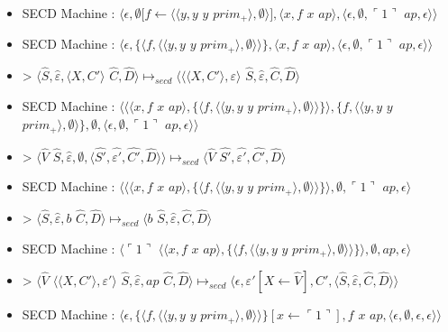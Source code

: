 \documentclass[10pt,a4paper]{article}
\begin{document}
\begin{itemize}
					\item[] SECD Machine : $\langle\epsilon,\emptyset[f \leftarrow \langle\langle y,y$ $y$ $prim_{+}\rangle,\emptyset\rangle],\langle x,f$ $x$ $ap\rangle,\langle\epsilon,\emptyset,\ulcorner 1\urcorner$ $ap,\epsilon\rangle\rangle$
					\item[] SECD Machine : $\langle\epsilon,\{\langle f,\langle\langle y,y$ $y$ $prim_{+}\rangle,\emptyset\rangle\rangle\},\langle x,f$ $x$ $ap\rangle,\langle\epsilon,\emptyset,\ulcorner 1\urcorner$ $ap,\epsilon\rangle\rangle$
					\item[] >  $\langle\widehat{S},\widehat{\varepsilon},\langle X,C'\rangle$ $\widehat{C},\widehat{D}\rangle \longmapsto_{secd} \langle\langle\langle X,C'\rangle,\varepsilon\rangle$ $\widehat{S},\widehat{\varepsilon},\widehat{C},\widehat{D}\rangle$
					\item[] SECD Machine : $\langle\langle\langle x,f$ $x$ $ap\rangle,\{\langle f,\langle\langle y,y$ $y$ $prim_{+}\rangle,\emptyset\rangle\rangle\}\rangle,\{f,\langle\langle y,y$ $y$ $prim_{+}\rangle,\emptyset\rangle\},\emptyset,\langle\epsilon,\emptyset,\ulcorner 1\urcorner$ $ap,\epsilon\rangle\rangle$
					\item[] > $\langle\widehat{V}$ $\widehat{S},\widehat{\varepsilon},\emptyset,\langle\widehat{S'},\widehat{\varepsilon'},\widehat{C'},\widehat{D}\rangle\rangle \longmapsto_{secd} \langle \widehat{V}$ $\widehat{S'},\widehat{\varepsilon'},\widehat{C'},\widehat{D}\rangle$
					\item[] SECD Machine : $\langle\langle\langle x,f$ $x$ $ap\rangle,\{\langle f,\langle\langle y,y$ $y$ $prim_{+}\rangle,\emptyset\rangle\rangle\}\rangle,\emptyset,\ulcorner 1\urcorner$ $ap,\epsilon\rangle$
					\item[] >  $\langle\widehat{S},\widehat{\varepsilon},b$ $\widehat{C},\widehat{D}\rangle \longmapsto_{secd} \langle b$ $\widehat{S},\widehat{\varepsilon},\widehat{C},\widehat{D}\rangle$
					\item[] SECD Machine :  $\langle\ulcorner 1\urcorner$ $\langle\langle x,f$ $x$ $ap\rangle,\{\langle f,\langle\langle y,y$ $y$ $prim_{+}\rangle,\emptyset\rangle\rangle\}\rangle,\emptyset,ap,\epsilon\rangle$
					\item[] >  $\langle\widehat{V}$ $\langle\langle X,C'\rangle,\varepsilon'\rangle$ $\widehat{S},\widehat{\varepsilon},ap$ $\widehat{C},\widehat{D}\rangle \longmapsto_{secd} \langle\epsilon,\varepsilon'[X \leftarrow \widehat{V}],C',\langle\widehat{S},\widehat{\varepsilon},\widehat{C},\widehat{D}\rangle\rangle$
					\item[] SECD Machine : $\langle\epsilon,\{\langle f,\langle\langle y,y$ $y$ $prim_{+}\rangle,\emptyset\rangle\rangle\}[x \leftarrow \ulcorner 1\urcorner],f$ $x$ $ap,\langle\epsilon,\emptyset,\epsilon,\epsilon\rangle\rangle$

\end{itemize}
\end{document}
